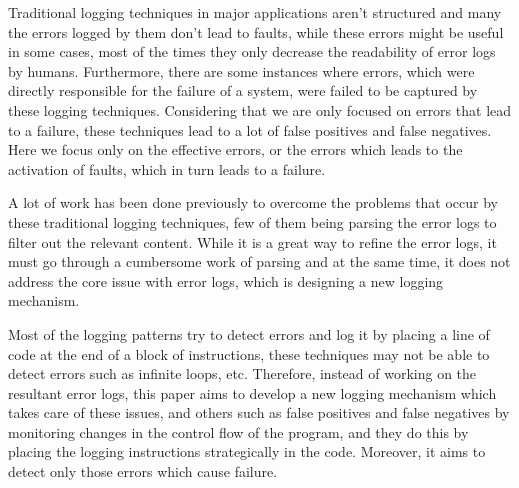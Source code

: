 Traditional logging techniques in major applications aren’t structured and many the errors logged by them don’t lead to faults, while these errors might be useful in some cases, most of the times they only decrease the readability of error logs by humans. Furthermore, there are some instances where errors, which were directly responsible for the failure of a system, were failed to be captured by these logging techniques. Considering that we are only focused on errors that lead to a failure, these techniques lead to a lot of false positives and false negatives. Here we focus only on the effective errors, or the errors which leads to the activation of faults, which in turn leads to a failure. 

A lot of work has been done previously to overcome the problems that occur by these traditional logging techniques, few of them being parsing the error logs to filter out the relevant content. While it is a great way to refine the error logs, it must go through a cumbersome work of parsing and at the same time, it does not address the core issue with error logs, which is designing a new logging mechanism. 

Most of the logging patterns try to detect errors and log it by placing a line of code at the end of a block of instructions, these techniques may not be able to detect errors such as infinite loops, etc. Therefore, instead of working on the resultant error logs, this paper aims to develop a new logging mechanism which takes care of these issues, and others such as false positives and false negatives by monitoring changes in the control flow of the program, and they do this by placing the logging instructions strategically in the code. Moreover, it aims to detect only those errors which cause failure. 


